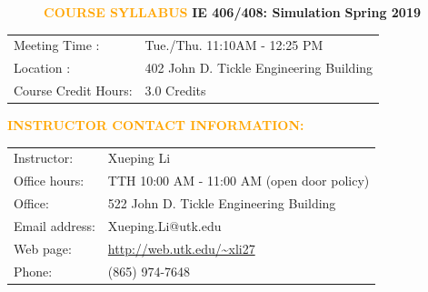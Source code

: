 \documentclass{article}
\begin{document}


\begin{figure}[ht]
\begin{minipage}[t]{0.40\linewidth}
\centering
{}

\label{fig:figure1}
\end{minipage}
\hspace{0.5cm}
\begin{minipage}[t]{0.5\linewidth}
\centering 
\vskip 0.2cm
\textcolor{orange}{\huge \bf COURSE SYLLABUS}
\vskip 0.2cm 
{\Large \bf IE 406/408: Simulation}
\vskip 0.2cm 
{\Large \bf Spring 2019}

\end{minipage}
\end{figure}
{\bf
\begin{tabular}{ll}
Meeting Time :	& Tue./Thu.   11:10AM - 12:25 PM \\
Location : & 402 John D. Tickle Engineering Building  \\
Course Credit Hours: & 3.0 Credits \\
\end{tabular}
}

\vskip 0.3in

\textcolor{orange}{ \bf INSTRUCTOR CONTACT INFORMATION:}
\vskip 0.2in
\begin{tabular}{ll}
Instructor: & Xueping Li\\
Office hours:	& TTH 10:00 AM - 11:00 AM  (open door policy)\\
Office:	& 522 John D. Tickle Engineering Building  \\
Email address: & Xueping.Li@utk.edu\\
Web page: & \url{http://web.utk.edu/~xli27}{}\\
Phone: & (865) 974-7648 \\



\end{tabular}
\end{document}
